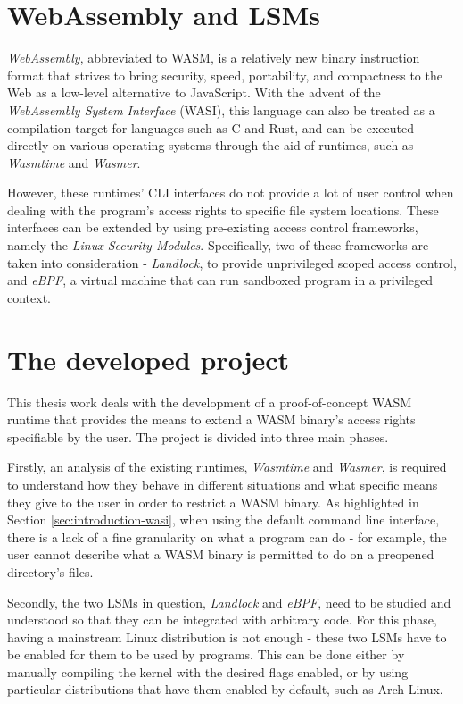 \section{WebAssembly and LSMs}

\textit{WebAssembly}, abbreviated to WASM, is a relatively new binary instruction format that
strives to bring security, speed, portability, and compactness to the Web
as a low-level alternative to JavaScript.
With the advent of the \textit{WebAssembly System Interface} (WASI),
this language can also be treated as a compilation target for languages such as C and Rust,
and can be executed directly on various operating systems
through the aid of runtimes, such as \textit{Wasmtime} and \textit{Wasmer}.

However, these runtimes' CLI interfaces do not provide a lot of user control
when dealing with the program's access rights to specific file system locations.
These interfaces can be extended by using pre-existing access control frameworks,
namely the \textit{Linux Security Modules}.
Specifically, two of these frameworks are taken into consideration - \textit{Landlock},
to provide unprivileged scoped access control, and \textit{eBPF}, a virtual
machine that can run sandboxed program in a privileged context.

\section{The developed project}

This thesis work deals with the development of a proof-of-concept WASM runtime that
provides the means to extend a WASM binary's access rights specifiable by the user.
The project is divided into three main phases.

Firstly, an analysis of the existing runtimes, \textit{Wasmtime} and \textit{Wasmer},
is required to understand how they behave in different situations and what
specific means they give to the user in order to restrict a WASM binary.
As highlighted in Section \ref{sec:introduction-wasi}, when using the default command line
interface, there is a lack of a fine granularity on what a program can do - for example,
the user cannot describe what a WASM binary is permitted to do on a preopened directory's files.

Secondly, the two LSMs in question, \textit{Landlock} and \textit{eBPF}, need to be studied and understood
so that they can be integrated with arbitrary code.
For this phase, having a mainstream Linux distribution is not enough - these two LSMs have to be enabled
for them to be used by programs. This can be done either by manually compiling the kernel with the desired
flags enabled, or by using particular distributions that have them enabled by default, such as Arch Linux.

